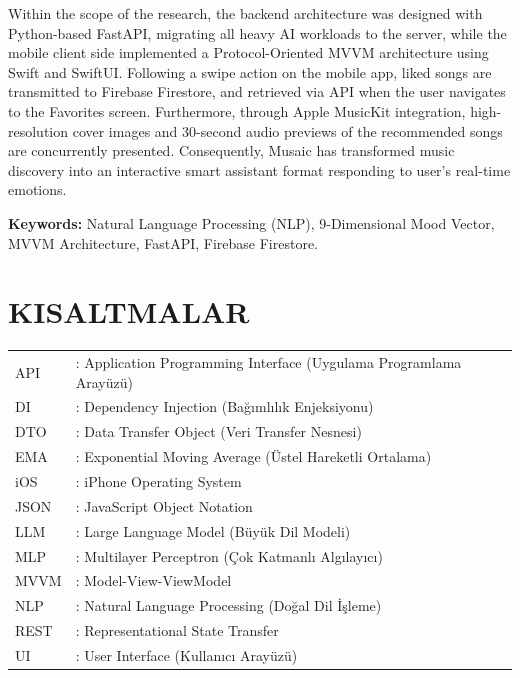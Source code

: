 \documentclass[12pt, a4paper]{report}
\begin{document}
Within the scope of the research, the backend architecture was designed with Python-based FastAPI, migrating all heavy AI workloads to the server, while the mobile client side implemented a Protocol-Oriented MVVM architecture using Swift and SwiftUI. Following a swipe action on the mobile app, liked songs are transmitted to Firebase Firestore, and retrieved via API when the user navigates to the Favorites screen. Furthermore, through Apple MusicKit integration, high-resolution cover images and 30-second audio previews of the recommended songs are concurrently presented. Consequently, Musaic has transformed music discovery into an interactive smart assistant format responding to user's real-time emotions.

\vspace{0.5cm}
\textbf{Keywords:} Natural Language Processing (NLP), 9-Dimensional Mood Vector, MVVM Architecture, FastAPI, Firebase Firestore.

\newpage
\tableofcontents

\newpage
{}
{}
\listoftables

\newpage
{}
{}
\listoffigures

\newpage
{}
{}
\chapter*{KISALTMALAR}

\begin{tabular}{ll}
  API  & : Application Programming Interface (Uygulama Programlama Arayüzü) \\[3pt]
  DI   & : Dependency Injection (Bağımlılık Enjeksiyonu) \\[3pt]
  DTO  & : Data Transfer Object (Veri Transfer Nesnesi) \\[3pt]
  EMA  & : Exponential Moving Average (Üstel Hareketli Ortalama) \\[3pt]
  iOS  & : iPhone Operating System \\[3pt]
  JSON & : JavaScript Object Notation \\[3pt]
  LLM  & : Large Language Model (Büyük Dil Modeli) \\[3pt]
  MLP  & : Multilayer Perceptron (Çok Katmanlı Algılayıcı) \\[3pt]
  MVVM & : Model-View-ViewModel \\[3pt]
  NLP  & : Natural Language Processing (Doğal Dil İşleme) \\[3pt]
  REST & : Representational State Transfer \\[3pt]
  UI   & : User Interface (Kullanıcı Arayüzü) \\
\end{tabular}
\end{document}

